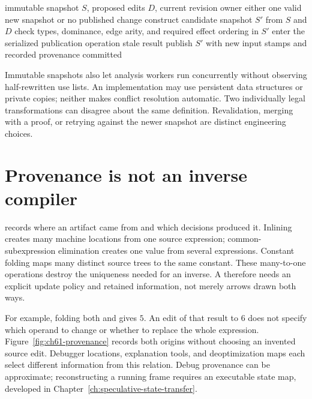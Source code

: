 \begin{algorithm}[htbp]
\caption{Commit an IR rewrite against the snapshot it actually inspected.}
\label{alg:ch61-transaction}
\begin{pseudocode}
\Require immutable snapshot $S$, proposed edits $D$, current revision owner
\Ensure either one valid new snapshot or no published change
\State construct candidate snapshot $S'$ from $S$ and $D$
\State check types, dominance, edge arity, and required effect ordering in $S'$
\State enter the serialized publication operation
  \State \Return stale result
\EndIf
\State publish $S'$ with new input stamps and recorded provenance
\State \Return committed
\end{pseudocode}
\end{algorithm}

Immutable snapshots also let analysis workers run concurrently without observing half-rewritten use lists.
An implementation may use persistent data structures or private copies; neither makes conflict resolution automatic.
Two individually legal transformations can disagree about the same definition.
Revalidation, merging with a proof, or retrying against the newer snapshot are distinct engineering choices.

\section{Provenance is not an inverse compiler}
\label{sec:ch61-provenance}

 records where an artifact came from and which decisions produced it.
Inlining creates many machine locations from one source expression; common-subexpression elimination creates one value from several expressions.
Constant folding maps many distinct source trees to the same constant.
These many-to-one operations destroy the uniqueness needed for an inverse.
A  therefore needs an explicit update policy and retained information, not merely arrows drawn both ways.

For example, folding both  and  gives $5$.
An edit of that result to $6$ does not specify which operand to change or whether to replace the whole expression.
Figure~\ref{fig:ch61-provenance} records both origins without choosing an invented source edit.
Debugger locations, explanation tools, and deoptimization maps each select different information from this relation.
Debug provenance can be approximate; reconstructing a running frame requires an executable state map, developed in Chapter~\ref{ch:speculative-state-transfer}.

